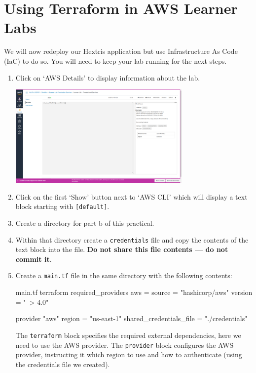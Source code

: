 \documentclass{csse4400}
\begin{document}


\section{Using Terraform in AWS Learner Labs}
We will now redeploy our Hextris application but use Infrastructure As Code (IaC) to do so. You will need to keep your lab running for the next steps.

\begin{enumerate}
\item Click on `AWS Details' to display information about the lab.

\includegraphics[width=0.7\textwidth]{images/aws-details}

\item Click on the first `Show' button next to `AWS CLI' which will display a text block starting with \texttt{[default]}.
\item Create a directory for part b of this practical.
\item Within that directory create a \texttt{credentials} file and copy the contents of the text block into the file.
\textbf{Do not share this file contents --- do not commit it}.
\item Create a \texttt{main.tf} file in the same directory with the following contents:
\begin{code}[language=terraform]{main.tf}
terraform {
    required_providers {
        aws = {
            source  = "hashicorp/aws"
            version = "~> 4.0"
        }
    }
}

provider "aws" {
    region = "us-east-1"
    shared_credentials_file = "./credentials"
}
\end{code}

The \texttt{terraform} block specifies the required external dependencies, here we need to use the AWS provider.
The \texttt{provider} block configures the AWS provider, instructing it which region to use and how to authenticate (using the credentials file we created).


\end{enumerate}
\end{document}
